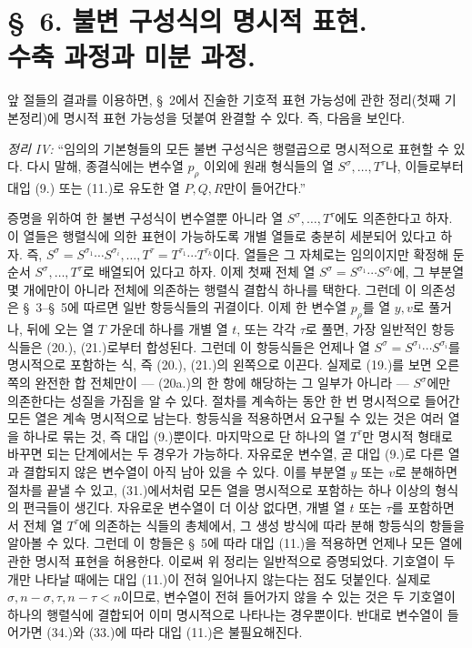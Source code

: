 
\section*{\S\ 6. 불변 구성식의 명시적 표현.\\수축 과정과 미분 과정.}
앞 절들의 결과를 이용하면, \S\ 2에서 진술한 기호적 표현 가능성에 관한 정리(첫째 기본정리)에 명시적 표현 가능성을 덧붙여 완결할 수 있다. 즉, 다음을 보인다.

\emph{정리 IV:} ``임의의 기본형들의 모든 불변 구성식은 행렬곱으로 명시적으로 표현할 수 있다. 다시 말해, 종결식에는 변수열 $p_\rho$ 이외에 원래 형식들의 열 $S^\sigma,\ldots,T^\tau$나, 이들로부터 대입 (9.) 또는 (11.)로 유도한 열 $P,Q,R$만이 들어간다.''

증명을 위하여 한 불변 구성식이 변수열뿐 아니라 열 $S^\sigma,\ldots,T^\tau$에도 의존한다고 하자. 이 열들은 행렬식에 의한 표현이 가능하도록 개별 열들로 충분히 세분되어 있다고 하자. 즉, $S^\sigma=S^{\sigma_1}\cdots S^{\sigma_i},\ldots,T^\tau=T^{\tau_1}\cdots T^{\tau_k}$이다. 열들은 그 자체로는 임의이지만 확정해 둔 순서 $S^\sigma,\ldots,T^\tau$로 배열되어 있다고 하자. 이제 첫째 전체 열 $S^\sigma=S^{\sigma_1}\cdots S^{\sigma_i}$에, 그 부분열 몇 개에만이 아니라 전체에 의존하는 행렬식 결합식 하나를 택한다. 그런데 이 의존성은 \S\ 3--\S\ 5에 따르면 일반 항등식들의 귀결이다. 이제 한 변수열 $p_\rho$를 열 $y,v$로 풀거나, 뒤에 오는 열 $T$ 가운데 하나를 개별 열 $t$, 또는 각각 $\tau$로 풀면, 가장 일반적인 항등식들은 (20.), (21.)로부터 합성된다. 그런데 이 항등식들은 언제나 열 $S^\sigma=S^{\sigma_1}\cdots S^{\sigma_i}$를 명시적으로 포함하는 식, 즉 (20.), (21.)의 왼쪽으로 이끈다. 실제로 (19.)를 보면 오른쪽의 완전한 합 전체만이 --- (20a.)의 한 항에 해당하는 그 일부가 아니라 --- $S^\sigma$에만 의존한다는 성질을 가짐을 알 수 있다. 절차를 계속하는 동안 한 번 명시적으로 들어간 모든 열은 계속 명시적으로 남는다. 항등식을 적용하면서 요구될 수 있는 것은 여러 열을 하나로 묶는 것, 즉 대입 (9.)뿐이다. 마지막으로 단 하나의 열 $T^\tau$만 명시적 형태로 바꾸면 되는 단계에서는 두 경우가 가능하다. 자유로운 변수열, 곧 대입 (9.)로 다른 열과 결합되지 않은 변수열이 아직 남아 있을 수 있다. 이를 부분열 $y$ 또는 $v$로 분해하면 절차를 끝낼 수 있고, (31.)에서처럼 모든 열을 명시적으로 포함하는 하나 이상의 형식의 편극들이 생긴다. 자유로운 변수열이 더 이상 없다면, 개별 열 $t$ 또는 $\tau$를 포함하면서 전체 열 $T^\tau$에 의존하는 식들의 총체에서, 그 생성 방식에 따라 분해 항등식의 항들을 알아볼 수 있다. 그런데 이 항들은 \S\ 5에 따라 대입 (11.)을 적용하면 언제나 모든 열에 관한 명시적 표현을 허용한다. 이로써 위 정리는 일반적으로 증명되었다. 기호열이 두 개만 나타날 때에는 대입 (11.)이 전혀 일어나지 않는다는 점도 덧붙인다. 실제로 $\sigma,n-\sigma,\tau,n-\tau<n$이므로, 변수열이 전혀 들어가지 않을 수 있는 것은 두 기호열이 하나의 행렬식에 결합되어 이미 명시적으로 나타나는 경우뿐이다. 반대로 변수열이 들어가면 (34.)와 (33.)에 따라 대입 (11.)은 불필요해진다.
